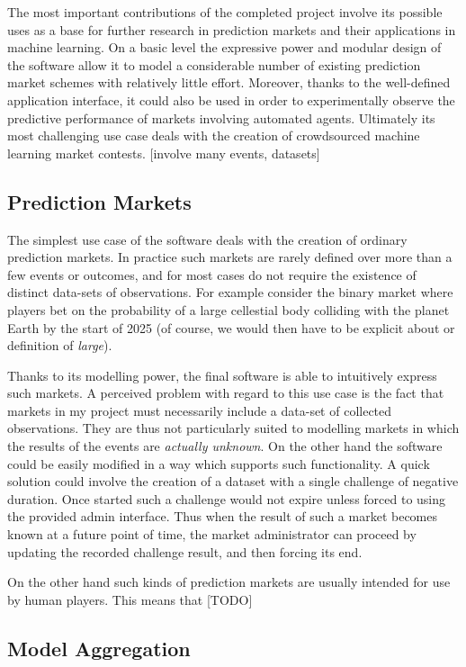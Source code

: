 \documentclass[bsc,frontabs,twoside,singlespacing,parskip,deptreport]{infthesis}     %
\begin{document}
	The most important contributions of the completed project involve its possible uses as a base for further research in prediction markets and their applications in machine learning. On a basic level the expressive power and modular design of the software allow it to model a considerable number of existing prediction market schemes with relatively little effort. Moreover, thanks to the well-defined application interface, it could also be used in order to experimentally observe the predictive performance of markets involving automated agents. Ultimately its most challenging use case deals with the creation of crowdsourced machine learning market contests. [involve many events, datasets]

\subsection{Prediction Markets}

	The simplest use case of the software deals with the creation of ordinary prediction markets. In practice such markets are rarely defined over more than a few events or outcomes, and for most cases do not require the existence of distinct data-sets of observations. For example consider the binary market where players bet on the probability of a large cellestial body colliding with the planet Earth by the start of 2025 (of course, we would then have to be explicit about or definition of {\it large}). 

	Thanks to its modelling power, the final software is able to intuitively express such markets. A perceived problem with regard to this use case is the fact that markets in my project must necessarily include a data-set of collected observations. They are thus not particularly suited to modelling markets in which the results of the events are {\it actually unknown}. On the other hand the software could be easily modified in a way which supports such functionality. A quick solution could involve the creation of a dataset with a single challenge of negative duration. Once started such a challenge would not expire unless forced to using the provided admin interface. Thus when the result of such a market becomes known at a future point of time, the market administrator can proceed by updating the recorded challenge result, and then forcing its end. 

	On the other hand such kinds of prediction markets are usually intended for use by human players. This means that [TODO]

\subsection{Model Aggregation}
\end{document}
